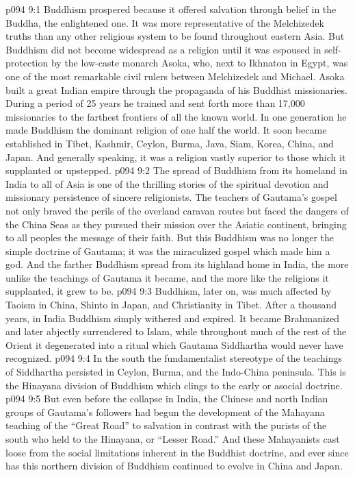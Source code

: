 \vs p094 9:1 Buddhism prospered because it offered salvation through belief in the Buddha, the enlightened one. It was more representative of the Melchizedek truths than any other religious system to be found throughout eastern Asia. But Buddhism did not become widespread as a religion until it was espoused in self\hyp{}protection by the low\hyp{}caste monarch Asoka, who, next to Ikhnaton in Egypt, was one of the most remarkable civil rulers between Melchizedek and Michael. Asoka built a great Indian empire through the propaganda of his Buddhist missionaries. During a period of 25 years he trained and sent forth more than 17,000 missionaries to the farthest frontiers of all the known world. In one generation he made Buddhism the dominant religion of one half the world. It soon became established in Tibet, Kashmir, Ceylon, Burma, Java, Siam, Korea, China, and Japan. And generally speaking, it was a religion vastly superior to those which it supplanted or upstepped.
\vs p094 9:2 The spread of Buddhism from its homeland in India to all of Asia is one of the thrilling stories of the spiritual devotion and missionary persistence of sincere religionists. The teachers of Gautama’s gospel not only braved the perils of the overland caravan routes but faced the dangers of the China Seas as they pursued their mission over the Asiatic continent, bringing to all peoples the message of their faith. But this Buddhism was no longer the simple doctrine of Gautama; it was the miraculized gospel which made him a god. And the farther Buddhism spread from its highland home in India, the more unlike the teachings of Gautama it became, and the more like the religions it supplanted, it grew to be.
\vs p094 9:3 Buddhism, later on, was much affected by Taoism in China, Shinto in Japan, and Christianity in Tibet. After a thousand years, in India Buddhism simply withered and expired. It became Brahmanized and later abjectly surrendered to Islam, while throughout much of the rest of the Orient it degenerated into a ritual which Gautama Siddhartha would never have recognized.
\vs p094 9:4 In the south the fundamentalist stereotype of the teachings of Siddhartha persisted in Ceylon, Burma, and the Indo\hyp{}China peninsula. This is the Hinayana division of Buddhism which clings to the early or asocial doctrine.
\vs p094 9:5 But even before the collapse in India, the Chinese and north Indian groups of Gautama’s followers had begun the development of the Mahayana teaching of the “Great Road” to salvation in contrast with the purists of the south who held to the Hinayana, or “Lesser Road.” And these Mahayanists cast loose from the social limitations inherent in the Buddhist doctrine, and ever since has this northern division of Buddhism continued to evolve in China and Japan.
